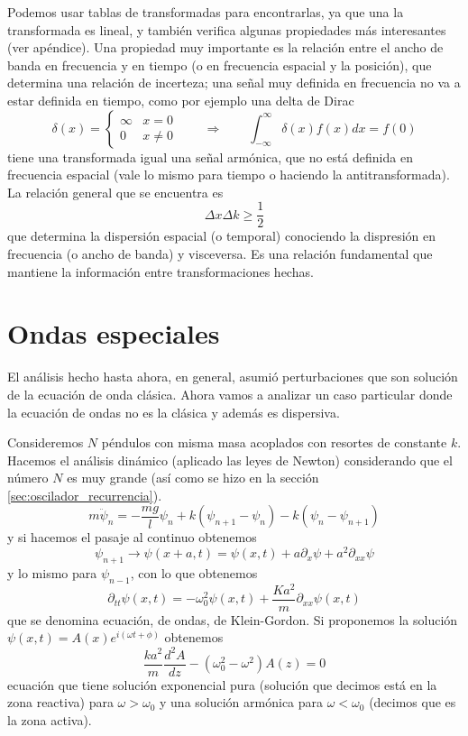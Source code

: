 \documentclass[a4paper]{article}
\numberwithin{equation}{section}
\begin{document}
			Podemos usar tablas de transformadas para encontrarlas, ya que una la transformada es lineal, y también verifica algunas propiedades más interesantes (ver apéndice). Una propiedad muy importante es la relación entre el ancho de banda en frecuencia y en tiempo (o en frecuencia espacial y la posición), que determina una relación de incerteza; una señal muy definida en frecuencia no va a estar definida en tiempo, como por ejemplo una delta de Dirac 
			\[\delta(x) = \begin{cases} \infty & x = 0 \\ 0 & x \neq 0 \end{cases} \qquad \Rightarrow \qquad \displaystyle \int_{-\infty}^{\infty} \delta(x) f(x) dx = f(0)\]
			tiene una transformada igual una señal armónica, que no está definida en frecuencia espacial (vale lo mismo para tiempo o haciendo la antitransformada). La relación general que se encuentra es
			\begin{equation}
				\Delta x \Delta k \geq \frac{1}{2}
				\label{eq:ondas_paquetes_incerteza}
			\end{equation}
			que determina la dispersión espacial (o temporal) conociendo la dispresión en frecuencia (o ancho de banda) y visceversa. Es una relación fundamental que mantiene la información entre transformaciones hechas.
\section{Ondas especiales}
	El análisis hecho hasta ahora, en general, asumió perturbaciones que son solución de la ecuación de onda clásica. Ahora vamos a analizar un caso particular donde la ecuación de ondas no es la clásica y además es dispersiva. 
	
	Consideremos $N$ péndulos con misma masa acoplados con resortes de constante $k$. Hacemos el análisis dinámico (aplicado las leyes de Newton) considerando que el número $N$ es muy grande (así como se hizo en la sección \ref{sec:oscilador_recurrencia}).
	\[ m \ddot{\psi}_n = - \frac{m g}{l} \psi_n + k (\psi_{n+1} - \psi_n) - k ( \psi_n - \psi_{n+1}) \]
	y si hacemos el pasaje al continuo obtenemos \[\psi_{n+1} \to \psi(x + a, t) = \psi(x, t) + a \partial_x \psi + a^2 \partial_{xx} \psi\] y lo mismo para $\psi_{n-1}$, con lo que obtenemos
	\begin{equation}
		\partial_{tt} \psi(x,t) = - \omega_0^2 \psi(x,t) + \frac{K a^2}{m} \partial_{xx} \psi(x,t)
		\label{eq:ondas_klein_gordon}
	\end{equation}
	que se denomina ecuación, de ondas, de Klein-Gordon. Si proponemos la solución $\psi(x,t) = A(x) e^{i (\omega t + \phi)}$ obtenemos
	\[ \frac{k a^2}{m} \frac{d^2 A}{d z} - (\omega_0^2 - \omega^2)A(z) = 0\]
	ecuación que tiene solución exponencial pura (solución que decimos está en la zona reactiva) para $\omega > \omega_0$ y una solución armónica para $\omega < \omega_0$ (decimos que es la zona activa). 
	
\end{document}
